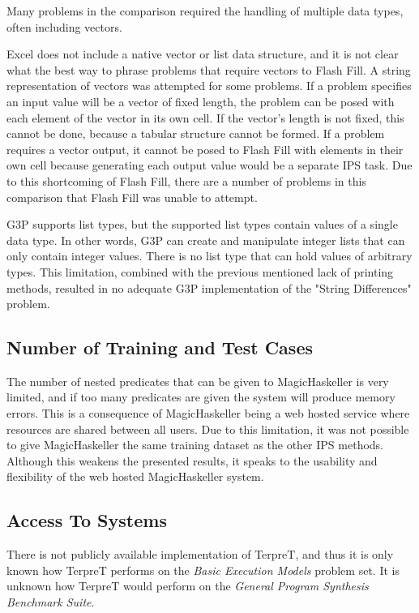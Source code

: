 Many problems in the comparison required the handling of multiple data types, often including vectors.  

Excel does not include a native vector or list data structure, and it is not clear what the best way to phrase problems that require vectors to Flash Fill. A string representation of vectors was attempted for some problems. If a problem specifies an input value will be a vector of fixed length, the problem can be posed with each element of the vector in its own cell. If the vector's length is not fixed, this cannot be done, because a tabular structure cannot be formed. If a problem requires a vector output, it cannot be posed to Flash Fill with elements in their own cell because generating each output value would be a separate IPS task. Due to this shortcoming of Flash Fill, there are a number of problems in this comparison that Flash Fill was unable to attempt.

G3P supports list types, but the supported list types contain values of a single data type. In other words, G3P can create and manipulate integer lists that can only contain integer values. There is no list type that can hold values of arbitrary types. This limitation, combined with the previous mentioned lack of printing methods, resulted in no adequate G3P implementation of the "String Differences" problem.

\subsection{Number of Training and Test Cases}

The number of nested predicates that can be given to MagicHaskeller is very limited, and if too many predicates are given the system will produce memory errors. This is a consequence of MagicHaskeller being a web hosted service where resources are shared between all users. Due to this limitation, it was not possible to give MagicHaskeller the same training dataset as the other IPS methods. Although this weakens the presented results, it speaks to the usability and flexibility of the web hosted MagicHaskeller system.

\subsection{Access To Systems}

There is not publicly available implementation of TerpreT, and thus it is only known how TerpreT performs on the \emph{Basic Execution Models} problem set. It is unknown how TerpreT would perform on the \emph{General Program Synthesis Benchmark Suite}.

